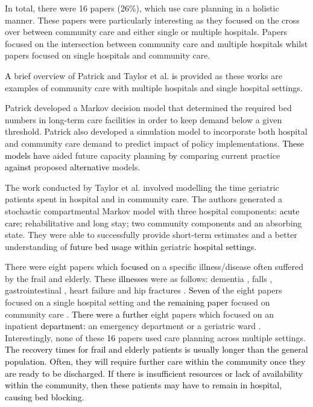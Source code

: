 \documentclass[../thesis.tex]{subfiles}
\begin{document}
In total, there were 16 papers (26\%), which use care planning in a holistic manner. These papers were particularly interesting as they focus\textcolor{black}{ed} on the cross over between community care and either single or multiple hospitals. Papers \cite{Davari, Intrevado, Johnson, Lim,McClean,Patrick,Ragab, Walker, Zychlinski} focused on the intersection between community care and multiple hospitals whilst papers \cite{Faddy,Garg1,Garg2, Gordon1,Gordon2, Hare, Taylor} focused on single hospitals and community care.

\textcolor{black}{A} brief overview of Patrick \cite{Patrick} and Taylor et al. \cite{Taylor} \textcolor{black}{is} provided as these works are examples of community care with multiple hospitals and single hospital settings. 

Patrick \cite{Patrick} developed a Markov decision model that determine\textcolor{black}{d} the required bed numbers in long\textcolor{black}{-}term care facilities in order to keep demand below a given threshold. Patrick also developed a simulation model to incorporate both hospital and community care demand to predict impact of policy implementations. \textcolor{black}{These models have} aided future capacity planning \textcolor{black}{by} comparing current practice \textcolor{black}{against} proposed \textcolor{black}{alternative} models.

The work conducted by Taylor et al. \cite{Taylor} involved modelling the time geriatric patients spent in hospital and in community \textcolor{black}{care}. The authors generated a stochastic compartmental Markov model with three hospital components: \textcolor{black}{acute care;} rehabilitative and long stay\textcolor{black}{;} two community components and an absorbing state. They were able to successfully provide short-term estimates and a better understanding of \textcolor{black}{future bed usage within} geriatric \textcolor{black}{hospital settings}.

There were eight papers which \textcolor{black}{focused} on a specific illness/disease often suffered by the frail and elderly. These \textcolor{black}{illnesses} were as follows\textcolor{black}{:} dementia \cite{Cepoiu}, falls \cite{Franklin}, gastrointestinal \cite{Abe}, heart failure \cite{Azad, Kul, Shaw} and hip fractures \cite{Beaupre, Wallace}. \textcolor{black}{Seven of} the eight papers focused on \textcolor{black}{a} single hospital setting and \textcolor{black}{the remaining paper} focused on community care \cite{Cepoiu}. \textcolor{black}{There were a further} eight papers which focused on an inpatient \textcolor{black}{department}\textcolor{black}{:} an emergency department \cite{Patrick, Rashwan, Rossille,Trevisan} or a geriatric ward \cite{Christodoulou, Franck, Gorunescu,Marshall3}. Interestingly, none of these \textcolor{black}{16} papers used care planning across multiple settings. \textcolor{black}{The recovery times for frail and elderly patients is usually longer than the general population. Often, they will require further care within the community once they are ready to be discharged. If there is insufficient resources or lack of availability within the community, then these patients may have to remain in hospital, causing bed blocking.}
\end{document}
